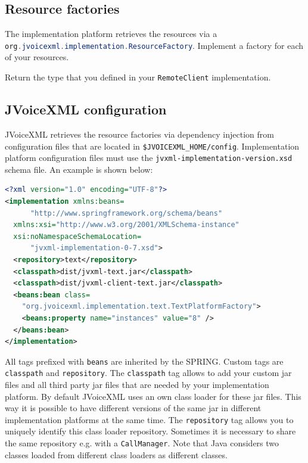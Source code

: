 \documentclass[11pt,a4paper]{article}
\begin{document}
\subsection{Resource factories}

The implementation platform retrieves the resources via a
\lstinline[language=Java]{org.jvoicexml.implementation.ResourceFactory}.
Implement a factory for each of your resources.

Return the type that you defined in your
\lstinline[language=Java]{RemoteClient} implementation.

\subsection{JVoiceXML configuration}

JVoiceXML retrieves the resource factories via dependency injection from
configuration files that are located in
\lstinline{$JVOICEXML_HOME/config}. Implementation platform configuration files
must use the \lstinline{jvxml-implementation-version.xsd} schema file.
An example is shown below:

\begin{lstlisting}[language=XML]
<?xml version="1.0" encoding="UTF-8"?>
<implementation xmlns:beans=
      "http://www.springframework.org/schema/beans"
  xmlns:xsi="http://www.w3.org/2001/XMLSchema-instance"
  xsi:noNamespaceSchemaLocation=
      "jvxml-implementation-0-7.xsd">
  <repository>text</repository>
  <classpath>dist/jvxml-text.jar</classpath>
  <classpath>dist/jvxml-client-text.jar</classpath>
  <beans:bean class=
    "org.jvoicexml.implementation.text.TextPlatformFactory">
    <beans:property name="instances" value="8" />
  </beans:bean>
</implementation>
\end{lstlisting}

All tags prefixed with \lstinline{beans} are inherited by the SPRING. Custom
tags are \lstinline{classpath} and \lstinline{repository}. The
\lstinline{classpath} tag allows to add your custom jar files and all third
party jar files that are needed by your implementation platform. By default
JVoiceXML uses an own class loader for these jar files. This way it is possible
to have different versions of the same jar in different implementation
platforms at the same time. The \lstinline{repository} tag allows you to
uniquely identify this class loader repository. Sometimes it is necessary to
share the same repository e.g. with a \lstinline[language=Java]{CallManager}.
Note that Java considers two classes loaded from different class loaders as
different classes.



\end{document}
